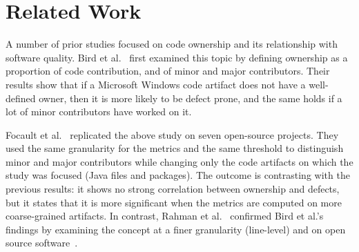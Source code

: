 

\section{Related Work}
\label{sec:rel}

A number of prior studies focused on code ownership and its relationship with software quality. Bird et al.~\cite{bird:original} first examined this topic by defining ownership as a proportion of code contribution, and of minor and major contributors. Their results show that if a Microsoft Windows code artifact does not have a well-defined owner, then it is more likely to be defect prone, and the same holds if a lot of minor contributors have worked on it. 

Focault et al.~\cite{Foucault:oss} replicated the above study on seven open-source projects. They used the same granularity for the metrics and the same threshold to distinguish minor and major contributors while changing only the code artifacts on which the study was focused (Java files and packages). The outcome is contrasting with the previous results: it shows no strong correlation between ownership and defects, but it states that it is more significant when the metrics are computed on more coarse-grained artifacts. In contrast, Rahman et al.~\cite{Rahman:blame} confirmed Bird et al.'s findings by examining the concept at a finer granularity (line-level) and on open source software~. 




